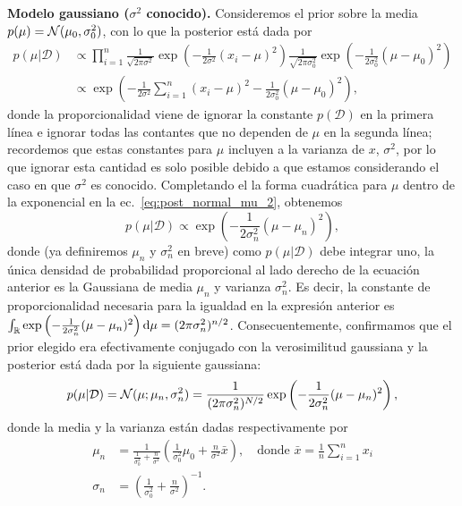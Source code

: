\begin{example} \textbf{Modelo gaussiano ($\sigma^2$ conocido).} Consideremos el prior sobre la media $p(\mu) = {\mathcal N}(\mu_0,\sigma_0^2)$, con lo que la posterior está dada por  
 \begin{align}
 	p(\mu|\mathcal{D}) &\propto \prod_{i=1}^n \frac{1}{\sqrt{2\pi\sigma^2}}\exp\left(-\frac{1}{2\sigma^2}(x_i-\mu)^2\right) \frac{1}{\sqrt{2\pi\sigma_0^2}}\exp\left(-\frac{1}{2\sigma_0^2}(\mu-\mu_0)^2\right)\label{eq:post_normal_mu_1}\\
 	&\propto \exp\left(-\frac{1}{2\sigma^2}\sum_{i=1}^n(x_i-\mu)^2-\frac{1}{2\sigma_0^2}(\mu-\mu_0)^2\right),\label{eq:post_normal_mu_2}
 \end{align} 
 donde la proporcionalidad viene de ignorar la constante $p(\mathcal{D})$ en la primera línea e ignorar todas las contantes que no dependen de $\mu$ en la segunda línea; recordemos que estas constantes para $\mu$ incluyen a la varianza de $x$, $\sigma^2$, por lo que ignorar esta cantidad es solo posible debido a que estamos considerando el caso en que $\sigma^2$ es conocido. Completando el la forma cuadrática para $\mu$ dentro de la exponencial en la ec.~\eqref{eq:post_normal_mu_2}, obtenemos
 \begin{equation}
 	p(\mu|\mathcal{D}) \propto \exp\left(-\frac{1}{2\sigma_n^2}(\mu - \mu_n)^2\right),\label{eq:post_normal_mu_3}
 \end{equation} 
 donde (ya definiremos $\mu_n$ y $\sigma_n^2$ en breve) como $p(\mu|\mathcal{D})$ debe integrar uno, la única densidad de probabilidad proporcional al lado derecho de la ecuación anterior es la Gaussiana de media $\mu_n$ y varianza $\sigma_n^2$. Es decir, la constante de proporcionalidad necesaria para la igualdad en la expresión anterior es $\int_{\mathbb R}\exp\left(-\frac{1}{2\sigma_n^2}(\mu - \mu_n)^2\right){\text{d}}\mu = (2\pi\sigma_n^2)^{n/2}$. Consecuentemente, confirmamos que el prior elegido era efectivamente conjugado con la verosimilitud gaussiana y la posterior está dada por la siguiente gaussiana:
  \begin{equation}
 	p(\mu|\mathcal{D}) = {\mathcal N}(\mu;\mu_n,\sigma_n^2) = \frac{1}{(2\pi\sigma_n^2)^{N/2}}\exp\left(-\frac{1}{2\sigma_n^2}(\mu - \mu_n)^2\right),\label{eq:post_normal_mu_4}
 \end{equation} 
 donde la media y la varianza están dadas respectivamente  por 
 \begin{align}
 	\mu_n &= \frac{1}{\tfrac{1}{\sigma_0^2} + \tfrac{n}{\sigma^2}} \left(\frac{1}{\sigma_0^2}\mu_0 + \frac{n}{\sigma^2}\bar{x} \right), \quad \text{donde } \bar{x} = \frac{1}{n}\sum_{i=1}^n x_i\label{eq:post_Gm}\\
 	\sigma_n &= \left(\frac{1}{\sigma_0^2} + \frac{n}{\sigma^2}\right)^{-1}.\label{eq:post_Gv}
 \end{align}
\end{example}
